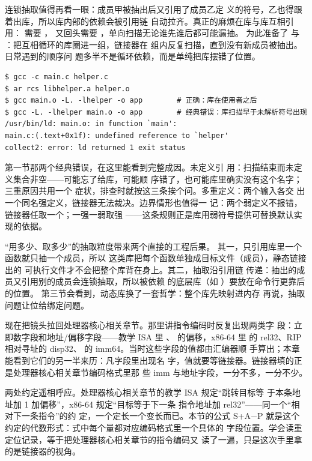 连锁抽取值得再看一眼：成员甲被抽出后又引用了成员乙定
义的符号，乙也得跟着出库，所以库内部的依赖会被引用链
自动拉齐。真正的麻烦在库与库互相引用：
需要 ， 又回头需要
，单向扫描无论谁先谁后都可能漏抽。
 为此准备了  与
：把互相循环的库圈进一组，链接器在
组内反复扫描，直到没有新成员被抽出。日常遇到的顺序问
题多半不是循环依赖，而是单纯把库摆错了位置。

\begin{lstlisting}
$ gcc -c main.c helper.c
$ ar rcs libhelper.a helper.o
$ gcc main.o -L. -lhelper -o app        # 正确：库在使用者之后
$ gcc -L. -lhelper main.o -o app        # 经典错误：库扫描早于未解析符号出现
/usr/bin/ld: main.o: in function `main':
main.c:(.text+0x1f): undefined reference to `helper'
collect2: error: ld returned 1 exit status
\end{lstlisting}

第一节那两个经典错误，在这里能看到完整成因。未定义引
用：扫描结束而未定义集合非空——可能忘了给库，可能顺
序错了，也可能库里确实没有这个名字；三重原因共用一个
症状，排查时就按这三条挨个问。多重定义：两个输入各交
出一个同名强定义，链接器无法裁决。边界情形也值得一
记：两个弱定义不报错，链接器任取一个；一强一弱取强
——这条规则正是库用弱符号提供可替换默认实现的依据。

“用多少、取多少”的抽取粒度带来两个直接的工程后果。
其一，只引用库里一个函数就只抽一个成员，所以
 这类库把每个函数单独成目标文件（成员），静态链接出的
可执行文件才不会把整个库背在身上。其二，抽取沿引用链
传递：抽出的成员又引用别的成员会连锁抽取，所以被依赖
的底层库（如 ）要放在命令行更靠后的位置。
第三节会看到，动态库换了一套哲学：整个库先映射进内存
再说，抽取问题让位给绑定问题。

现在把镜头拉回处理器核心相关章节。那里讲指令编码时反复出现两类字
段：立即数字段和地址/偏移字段——教学 ISA 里
、 的偏移，x86-64 里
 的 rel32、RIP 相对寻址的 disp32、
 的 imm64。当时这些字段的值都由汇编器顺
手算出；本章能看到它们的另一半来历：凡字段里出现名
字，值就要等链接器。链接器填的正是处理器核心相关章节编码格式里那
些 imm 与地址字段，一分不多，一分不少。

两处约定遥相呼应。处理器核心相关章节的教学 ISA 规定“跳转目标等
于本条地址加 1 加偏移”，x86-64 规定“目标等于下一条
指令地址加 rel32”——同一个“相对下一条指令”的约
定，一个定长一个变长而已。本节的公式 S+A−P 就是这个
约定的代数形式：式中每个量都对应编码格式里一个具体的
字段位置。学会读重定位记录，等于把处理器核心相关章节的指令编码又
读了一遍，只是这次手里拿的是链接器的视角。

